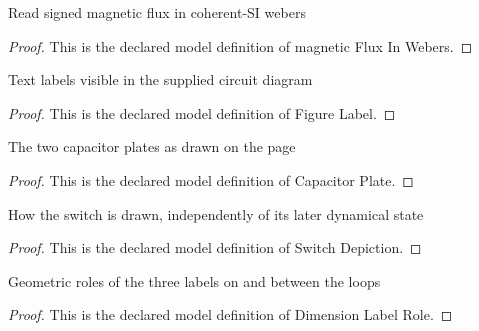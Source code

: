 \begin{definition}
  \label{def:physics:phyx-mini-0974:phyxminiproblems-problemphyxmini0974-magneticfluxinwebers}
  Read signed magnetic flux in coherent-SI webers
\end{definition}
\begin{proof}
  This is the declared model definition of magnetic Flux In Webers.
\end{proof}
\begin{definition}
  \label{def:physics:phyx-mini-0974:phyxminiproblems-problemphyxmini0974-figurelabel}
  Text labels visible in the supplied circuit diagram
\end{definition}
\begin{proof}
  This is the declared model definition of Figure Label.
\end{proof}
\begin{definition}
  \label{def:physics:phyx-mini-0974:phyxminiproblems-problemphyxmini0974-capacitorplate}
  The two capacitor plates as drawn on the page
\end{definition}
\begin{proof}
  This is the declared model definition of Capacitor Plate.
\end{proof}
\begin{definition}
  \label{def:physics:phyx-mini-0974:phyxminiproblems-problemphyxmini0974-switchdepiction}
  How the switch is drawn, independently of its later dynamical state
\end{definition}
\begin{proof}
  This is the declared model definition of Switch Depiction.
\end{proof}
\begin{definition}
  \label{def:physics:phyx-mini-0974:phyxminiproblems-problemphyxmini0974-dimensionlabelrole}
  Geometric roles of the three labels on and between the loops
\end{definition}
\begin{proof}
  This is the declared model definition of Dimension Label Role.
\end{proof}
